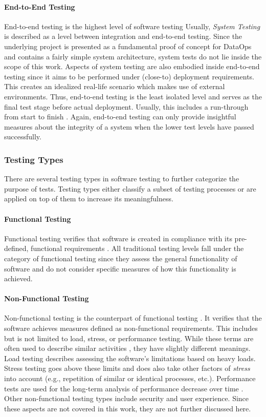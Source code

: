 \paragraph{End-to-End Testing} End-to-end testing is the highest level of software testing \cite[67]{Mahfuz2016} Usually, \textit{System Testing} is described as a level between integration and end-to-end testing. Since the underlying project is presented as a fundamental proof of concept for DataOps and contains a fairly simple system architecture, system tests do not lie inside the scope of this work. Aspects of system testing are also embodied inside end-to-end testing since it aims to be performed under (close-to) deployment requirements. This creates an idealized real-life scenario which makes use of external environments. Thus, end-to-end testing is the least isolated level and serves as the final test stage before actual deployment. Usually, this includes a run-through from start to finish \cite[67]{Mahfuz2016}. Again, end-to-end testing can only provide insightful measures about the integrity of a system when the lower test levels have passed successfully.

\subsubsection{Testing Types}
There are several testing types in software testing to further categorize the purpose of tests. Testing types either classify a subset of testing processes or are applied on top of them to increase its meaningfulness.

\paragraph{Functional Testing}
Functional testing verifies that software is created in compliance with its pre-defined, functional requirements \cite[69]{Mahfuz2016}. All traditional testing levels fall under the category of functional testing since they assess the general functionality of software and do not consider specific measures of how this functionality is achieved.

\paragraph{Non-Functional Testing}
Non-functional testing is the counterpart of functional testing \cite[69]{Mahfuz2016}. It verifies that the software achieves measures defined as non-functional requirements. This includes but is not limited to load, stress, or performance testing. While these terms are often used to describe similar activities \cite[70]{Mahfuz2016}, they have slightly different meanings. Load testing describes assessing the software's limitations based on heavy loads. Stress testing goes above these limits and does also take other factors of \textit{stress} into account (e.g., repetition of similar or identical processes, etc.). Performance tests are used for the long-term analysis of performance decrease over time \cite[70]{Mahfuz2016}. Other non-functional testing types include security and user experience. Since these aspects are not covered in this work, they are not further discussed here.

